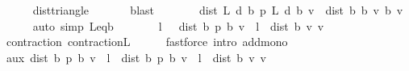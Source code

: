 \begin{isabellebody}
\ \ \ \ \isamarkupfalse%
\ dist{\isacharunderscore}{\kern0pt}triangle\ \isanewline
\ \ \ \ \isamarkupfalse%
\ blast\isanewline
\ \ \isamarkupfalse%
\ \isamarkupfalse%
\ {\isachardoublequoteopen}{\isasymdots}\ {\isacharequal}{\kern0pt}\ dist\ {\isacharparenleft}{\kern0pt}L\ {\isacharquery}{\kern0pt}d\ {\isacharparenleft}{\kern0pt}{\isasymnu}\isactrlsub b\ {\isacharquery}{\kern0pt}p{\isacharparenright}{\kern0pt}{\isacharparenright}{\kern0pt}\ {\isacharparenleft}{\kern0pt}L\ {\isacharquery}{\kern0pt}d\ {\isacharparenleft}{\kern0pt}{\isasymL}\isactrlsub b\ v{\isacharparenright}{\kern0pt}{\isacharparenright}{\kern0pt}\ {\isacharplus}{\kern0pt}\ dist\ {\isacharparenleft}{\kern0pt}{\isasymL}\isactrlsub b\ {\isacharparenleft}{\kern0pt}{\isasymL}\isactrlsub b\ v{\isacharparenright}{\kern0pt}{\isacharparenright}{\kern0pt}\ {\isacharparenleft}{\kern0pt}{\isasymL}\isactrlsub b\ v{\isacharparenright}{\kern0pt}{\isachardoublequoteclose}\isanewline
\ \ \ \ \isamarkupfalse%
\ {\isacharparenleft}{\kern0pt}auto\ simp{\isacharcolon}{\kern0pt}\ L{\isacharunderscore}{\kern0pt}eq{\isacharunderscore}{\kern0pt}{\isasymL}\isactrlsub b{\isacharparenright}{\kern0pt}\isanewline
\ \ \isamarkupfalse%
\ \isamarkupfalse%
\ {\isachardoublequoteopen}{\isasymdots}\ {\isasymle}\ l\ {\isacharasterisk}{\kern0pt}\ \ dist\ {\isacharparenleft}{\kern0pt}{\isasymnu}\isactrlsub b\ {\isacharquery}{\kern0pt}p{\isacharparenright}{\kern0pt}\ {\isacharparenleft}{\kern0pt}{\isasymL}\isactrlsub b\ v{\isacharparenright}{\kern0pt}\ {\isacharplus}{\kern0pt}\ l\ {\isacharasterisk}{\kern0pt}\ dist\ {\isacharparenleft}{\kern0pt}{\isasymL}\isactrlsub b\ v{\isacharparenright}{\kern0pt}\ v{\isachardoublequoteclose}\isanewline
\ \ \ \ \isamarkupfalse%
\ contraction{\isacharunderscore}{\kern0pt}{\isasymL}\ contraction{\isacharunderscore}{\kern0pt}L\isanewline
\ \ \ \ \isamarkupfalse%
\ {\isacharparenleft}{\kern0pt}fastforce\ intro{\isacharbang}{\kern0pt}{\isacharcolon}{\kern0pt}\ add{\isacharunderscore}{\kern0pt}mono{\isacharparenright}{\kern0pt}\isanewline
\ \ \isamarkupfalse%
\ \isamarkupfalse%
\ aux{\isacharcolon}{\kern0pt}\ {\isachardoublequoteopen}dist\ {\isacharparenleft}{\kern0pt}{\isasymnu}\isactrlsub b\ {\isacharquery}{\kern0pt}p{\isacharparenright}{\kern0pt}\ {\isacharparenleft}{\kern0pt}{\isasymL}\isactrlsub b\ v{\isacharparenright}{\kern0pt}\ {\isasymle}\ l\ {\isacharasterisk}{\kern0pt}\ dist\ {\isacharparenleft}{\kern0pt}{\isasymnu}\isactrlsub b\ {\isacharquery}{\kern0pt}p{\isacharparenright}{\kern0pt}\ {\isacharparenleft}{\kern0pt}{\isasymL}\isactrlsub b\ v{\isacharparenright}{\kern0pt}\ {\isacharplus}{\kern0pt}\ l\ {\isacharasterisk}{\kern0pt}\ dist\ {\isacharparenleft}{\kern0pt}{\isasymL}\isactrlsub b\ v{\isacharparenright}{\kern0pt}\ v{\isachardoublequoteclose}\ \isacommand{{\isachardot}{\kern0pt}}\isamarkupfalse%

\end{isabellebody}
